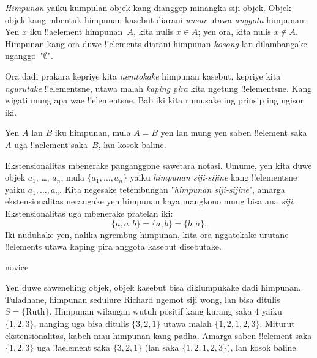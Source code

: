 \documentclass[../../../include/open-logic-section]{subfiles}
\begin{document}

\emph{Himpunan} yaiku kumpulan objek kang dianggep {minangka} siji
objek. Objek-objek kang mbentuk himpunan kasebut diarani \emph{unsur}
utawa \emph{anggota} himpunan. Yen $x$ iku !!a{element} himpunan~$A$,
kita nulis $x \in A$; yen ora, kita nulis $x \notin A$.
Himpunan kang ora duwe !!{element}s diarani himpunan \emph{kosong}
lan dilambangake nganggo~"$\emptyset$".

\begin{explain}
Ora dadi prakara kepriye kita \emph{nemtokake} himpunan kasebut,
kepriye kita \emph{ngurutake} !!{element}sne, utawa malah \emph{kaping
pira} kita ngetung !!{element}sne. Kang wigati mung apa wae
!!{element}sne. Bab iki kita rumusake ing prinsip ing ngisor iki.
\end{explain}

\begin{defn}[Ekstensionalitas]
  Yen $A$ lan $B$ iku himpunan, mula $A = B$ yen lan mung yen
  saben !!{element} saka~$A$ uga !!a{element} saka~$B$, lan
  kosok baline.
\end{defn}

Ekstensionalitas mbenerake panganggone sawetara notasi. Umume, yen
kita duwe objek $a_{1}$, \dots, $a_{n}$, mula $\{a_{1}, \dots, a_{n}\}$
yaiku \emph{himpunan siji-sijine} kang !!{element}sne yaiku
$a_1, \ldots, a_n$. Kita negesake tetembungan
"\emph{himpunan siji-sijine}", amarga ekstensionalitas nerangake yen
himpunan kaya mangkono mung bisa ana \emph{siji}. Ekstensionalitas uga
mbenerake pratelan iki:
  \[
    \{a, a, b\} = \{a, b\} = \{b,a\}.
  \]
Iki nuduhake yen, nalika ngrembug himpunan, kita ora nggatekake
urutane !!{element}s utawa kaping pira anggota kasebut disebutake.

\begin{tagblock}{novice}
\begin{ex}
Yen duwe sawenehing objek, objek kasebut bisa diklumpukake dadi
himpunan. Tuladhane, himpunan sedulure Richard ngemot siji wong,
lan bisa ditulis $S=\{\textrm{Ruth}\}$.
Himpunan wilangan wutuh positif kang kurang saka $4$ yaiku
$\{1, 2, 3\}$, nanging uga bisa ditulis $\{3, 2, 1\}$ utawa malah
$\{1, 2, 1, 2, 3\}$. Miturut ekstensionalitas, kabeh mau himpunan
kang padha. Amarga saben !!{element} saka $\{1, 2, 3\}$ uga
!!a{element} saka $\{3, 2, 1\}$ (lan saka $\{1,
2, 1, 2, 3\}$), lan kosok baline.
\end{ex}
\end{tagblock}
\end{document}
